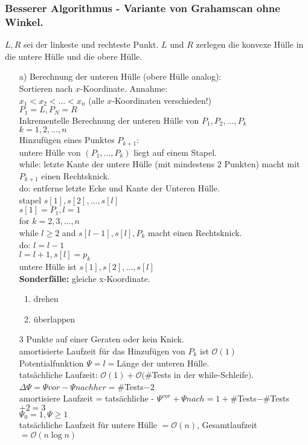\subsubsection{Besserer Algorithmus - Variante von Grahamscan ohne Winkel.}
$L,R$ sei der linkeste und rechteste Punkt. $L$ und $R$ zerlegen die konvexe Hülle in die untere Hülle und die obere Hülle.\\
\begin{enumerate}
\item[a)] Berechnung der unteren Hülle (obere Hülle analog):\\
Sortieren nach $x$-Koordinate. Annahme:\\
$x_1 < x_2 < ... < x_n$ (alle $x$-Koordinaten verschieden!)\\
$P_1 = L, P_N = R$\\
Inkrementelle Berechnung der unteren Hülle von $P_1,P_2,...,P_k$\\
$k=1,2,...,n$\\
Hinzufügen eines Punktes $P_{k+1}$:\\
untere Hülle von $(P_1,...,P_k)$ liegt auf einem Stapel.\\
while: letzte Kante der untere Hülle (mit mindestens 2 Punkten) macht mit $P_{k+1}$ einen Rechtsknick.\\
do: entferne letzte Ecke und Kante der Unteren Hülle.\\
stapel $s[1],s[2],...,s[l]$\\
$s[1] = P_1, l = 1$\\
for $k=2,3,...,n$\\
while $l \geq 2$ and $s[l-1],s[l],P_k$ macht einen Rechtsknick.\\
do: $l=l-1$\\
$l=l+1,s[l]=p_k$\\
untere Hülle ist $s[1],s[2],...,s[l]$\\
\textbf{Sonderfälle:}
gleiche x-Koordinate.
\begin{enumerate}
\item drehen
\item überlappen
\end{enumerate}
3 Punkte auf einer Geraten oder kein Knick.\\
amortisierte Laufzeit für das Hinzufügen von $P_k$ ist $\mathcal{O}(1)$\\
Potentialfunktion $\Psi = l = $Länge der unteren Hülle.\\
tatsächliche Laufzeit: $\mathcal{O}(1)+\mathcal{O}(\#$Tests in der while-Schleife$)$.\\
$\Delta \Psi = \Psi{vor} - \Psi{nachher} = \#$Tests$-2$\\
amortisiere Laufzeit = tatsächliche - $\Psi^{vor}+\Psi{nach} = 1 +\#$Tests$-\#$Tests$+2=3$\\
$\Psi_0=1, \Psi \geq 1$\\
tatsächliche Laufzeit für untere Hülle $= \mathcal{O}(n)$, Gesamtlaufzeit $= \mathcal{O}(n \log n)$\\
\end{enumerate}
